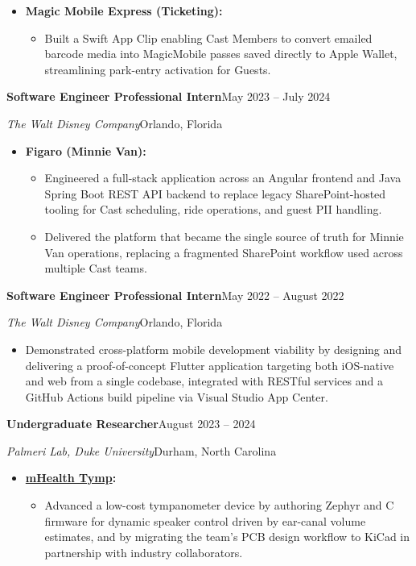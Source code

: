 \documentclass[10pt,letterpaper]{article}
\newcommand{\entry}[2]{%
  \noindent\textbf{#1}\hfill #2\par\vspace{-1pt}%
}
\newcommand{\subentry}[2]{%
  \noindent\textit{#1}\hfill #2\par\vspace{1pt}%
}
\begin{document}
\begin{itemize}
\begin{itemize}
    \item Delivered the first production ridership telemetry used for bus route planning and guest-experience decisions.
  \end{itemize}
  \item \textbf{Magic Mobile Express (Ticketing):}
  \begin{itemize}
    \item Built a Swift App Clip enabling Cast Members to convert emailed barcode media into MagicMobile passes saved directly to Apple Wallet, streamlining park-entry activation for Guests.
  \end{itemize}
\end{itemize}

\vspace{0.1em}
\entry{Software Engineer Professional Intern}{May 2023 -- July 2024}
\subentry{The Walt Disney Company}{Orlando, Florida}
\begin{itemize}
  \item \textbf{Figaro (Minnie Van):}
  \begin{itemize}
    \item Engineered a full-stack application across an Angular frontend and Java Spring Boot REST API backend to replace legacy SharePoint-hosted tooling for Cast scheduling, ride operations, and guest PII handling.
    \item Delivered the platform that became the single source of truth for Minnie Van operations, replacing a fragmented SharePoint workflow used across multiple Cast teams.
  \end{itemize}
\end{itemize}

\vspace{0.1em}
\entry{Software Engineer Professional Intern}{May 2022 -- August 2022}
\subentry{The Walt Disney Company}{Orlando, Florida}
\begin{itemize}
  \item Demonstrated cross-platform mobile development viability by designing and delivering a proof-of-concept Flutter application targeting both iOS-native and web from a single codebase, integrated with RESTful services and a GitHub Actions build pipeline via Visual Studio App Center.
\end{itemize}

\vspace{0.1em}
\entry{Undergraduate Researcher}{August 2023 -- 2024}
\subentry{Palmeri Lab, Duke University}{Durham, North Carolina}
\begin{itemize}
  \item \textbf{\href{https://pratt.duke.edu/news/preventing-childhood-hearing-loss-worldwide/}{mHealth Tymp}:}
  \begin{itemize}
    \item Advanced a low-cost tympanometer device by authoring Zephyr and C firmware for dynamic speaker control driven by ear-canal volume estimates, and by migrating the team's PCB design workflow to KiCad in partnership with industry collaborators.
  \end{itemize}
\end{itemize}
\end{document}
